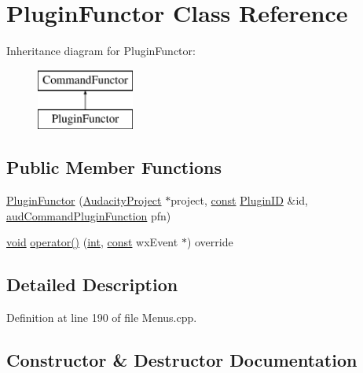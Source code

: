 \hypertarget{class_plugin_functor}{}\section{Plugin\+Functor Class Reference}
\label{class_plugin_functor}
Inheritance diagram for Plugin\+Functor\+:\begin{figure}[H]
\begin{center}
\leavevmode
\includegraphics[height=2.000000cm]{class_plugin_functor}
\end{center}
\end{figure}
\subsection*{Public Member Functions}
\begin{DoxyCompactItemize}
\item 
\hyperlink{class_plugin_functor_a18c45119a254c85208768647cf556387}{Plugin\+Functor} (\hyperlink{class_audacity_project}{Audacity\+Project} $\ast$project, \hyperlink{getopt1_8c_a2c212835823e3c54a8ab6d95c652660e}{const} \hyperlink{include_2audacity_2_types_8h_abe9b737fcebc2b5bea606246e1eab52e}{Plugin\+ID} \&id, \hyperlink{_menus_8cpp_a2312027c4ed4a38feb598743652d0469}{aud\+Command\+Plugin\+Function} pfn)
\item 
\hyperlink{sound_8c_ae35f5844602719cf66324f4de2a658b3}{void} \hyperlink{class_plugin_functor_a688f67b77da64da924f1b88f5c1d40b6}{operator()} (\hyperlink{xmltok_8h_a5a0d4a5641ce434f1d23533f2b2e6653}{int}, \hyperlink{getopt1_8c_a2c212835823e3c54a8ab6d95c652660e}{const} wx\+Event $\ast$) override
\end{DoxyCompactItemize}


\subsection{Detailed Description}


Definition at line 190 of file Menus.\+cpp.



\subsection{Constructor \& Destructor Documentation}
